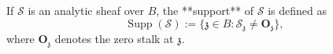 If $\mathcal{S}$ is an analytic sheaf over $B$, the **support** of $\mathcal{S}$ is defined as
$$
\operatorname{Supp}(\mathcal{S}) := \{\mathfrak{z} \in B : \mathcal{S}_{\mathfrak{z}} \neq \mathbf{O}_{\mathfrak{z}}\},
$$
where $\mathbf{O}_{\mathfrak{z}}$ denotes the zero stalk at $\mathfrak{z}$.
